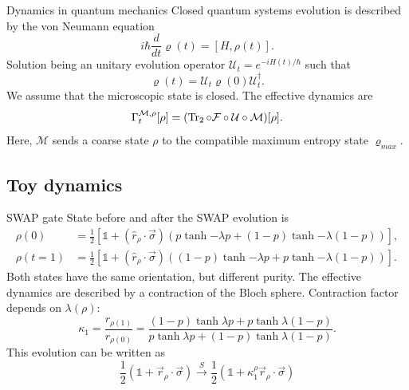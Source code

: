 \documentclass{cubeamer}
\newcommand{\mcU}{\mathcal{U}}
\newcommand{\mcF}{\mathcal{F}}
\newcommand{\mcM}{\mathcal{M}}
\newcommand{\Id}{\mathds{1}}%
\begin{document}
\begin{frame}{Dynamics in quantum mechanics}
    Closed quantum systems evolution is described by the von Neumann equation
    \begin{equation*}
        i\hbar\frac{d}{d t} \varrho(t)=[H,\rho(t)].
    \end{equation*}
    Solution being an unitary evolution operator $\mcU_{t}=e^{-iH(t)/\hbar}$ such that
    \begin{equation*}
        \varrho(t)=\mcU_{t}\varrho(0)\mcU_{t}^{\dag}.
    \end{equation*}
    We assume that the microscopic state is closed. The effective dynamics are
    \begin{equation*}
        \Gamma_{t}^{\mcM,\rho}[\rho]=(\Tr_{2}\circ\mcF\circ\mcU\circ\mcM)[\rho].
    \end{equation*}
        Here, $\mcM$ sends a coarse state $\rho$ to the compatible maximum entropy state $\varrho_{max}$.
\end{frame}

\subsection{Toy dynamics}

\begin{frame}{SWAP gate}
    State before and after the SWAP evolution is
    \begin{align*}
        \rho(0)&=\frac{1}{2}[\Id+(\hat{r}_{\rho}\cdot\vec{\sigma})(p\tanh{-\lambda p}+(1-p)\tanh{-\lambda (1-p)})],\\
        \rho(t=1)&=\frac{1}{2}[\Id+(\hat{r}_{\rho}\cdot\vec{\sigma})((1-p)\tanh{-\lambda p}+p\tanh{-\lambda (1-p)})].
        \end{align*}
    Both states have the same orientation, but different purity. The effective dynamics are described by a contraction of the Bloch sphere. Contraction factor depends on $\lambda(\rho)$:
    \begin{equation*}
        \kappa_{1}=\frac{r_{\rho(1)}}{r_{\rho(0)}}=\frac{(1-p)\tanh{\lambda p}+p\tanh{\lambda (1-p)}}{
          p\tanh{\lambda p}+(1-p)\tanh{\lambda (1-p)}}.
      \end{equation*}
      This evolution can be written as
      \begin{equation*}
        \boxed{\frac{1}{2}(\Id+\vec{r}_{\rho}\cdot\vec{\sigma}) \xrightarrow{S} \frac{1}{2}(\Id+\kappa_{1}^{\rho}\vec{r}_{\rho}\cdot\vec{\sigma})}
      \end{equation*}
\end{frame}
\end{document}
